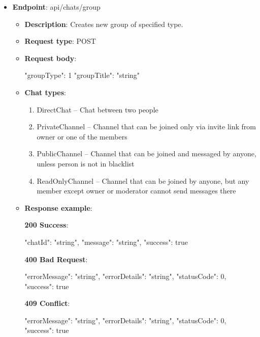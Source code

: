 \begin{itemize}
    \item \textbf{Endpoint}: api/chats/group
    \begin{itemize}
        \item \textbf{Description}: Creates new group of specified type.
        \item \textbf{Request type}: POST
        \item \textbf{Request body}:
        \begin{spverbatim}
        {
            "groupType": 1
            "groupTitle": "string"
        }
        \end{spverbatim}
        \item \textbf{Chat types}:
        \begin{enumerate}
            \item DirectChat -- Chat between two people
            \item PrivateChannel -- Channel that can be joined only via invite link from owner or one of the members
            \item PublicChannel -- Channel that can be joined and messaged by anyone, unless person is not in blacklist
            \item ReadOnlyChannel -- Channel that can be joined by anyone, but any member except owner or moderator cannot send messages there
        \end{enumerate}
        \item \textbf{Response example}:

        \textbf{200 Success}:

        \begin{spverbatim}
        {
            "chatId": "string",
            "message": "string",
            "success": true
        }
        \end{spverbatim}

        \textbf{400 Bad Request}:

        \begin{spverbatim}
        {
            "errorMessage": "string",
            "errorDetails": "string",
            "statusCode": 0,
            "success": true
        }
        \end{spverbatim}

        \textbf{409 Conflict}:

        \begin{spverbatim}
        {
            "errorMessage": "string",
            "errorDetails": "string",
            "statusCode": 0,
            "success": true
        }
        \end{spverbatim}


\end{itemize}
\end{itemize}

